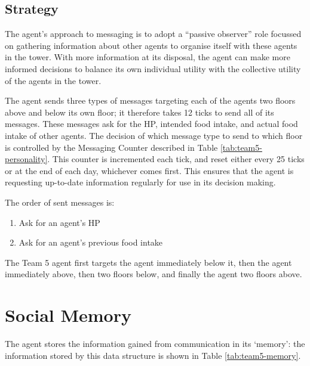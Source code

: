\subsection*{Strategy}\label{sec:team5-messaging-strategy}
The agent's approach to messaging is to adopt a ``passive observer'' role focussed on gathering information about other agents to organise itself with these agents in the tower. With more information at its disposal, the agent can make more informed decisions to balance its own individual utility with the collective utility of the agents in the tower.

The agent sends three types of messages targeting each of the agents two floors above and below its own floor; it therefore takes 12 ticks to send all of its messages. These messages ask for the HP, intended food intake, and actual food intake of other agents. The decision of which message type to send to which floor is controlled by the Messaging Counter described in Table \ref{tab:team5-personality}. This counter is incremented each tick, and reset either every 25 ticks or at the end of each day, whichever comes first. This ensures that the agent is requesting up-to-date information regularly for use in its decision making.

The order of sent messages is:
\begin{enumerate}
    \item Ask for an agent's HP
    \item Ask for an agent's previous food intake
\end{enumerate}
The Team 5 agent first targets the agent immediately below it, then the agent immediately above, then two floors below, and finally the agent two floors above.

\section{Social Memory}\label{sec:team5-memory}
The agent stores the information gained from communication in its `memory': the information stored by this data structure is shown in Table \ref{tab:team5-memory}.

